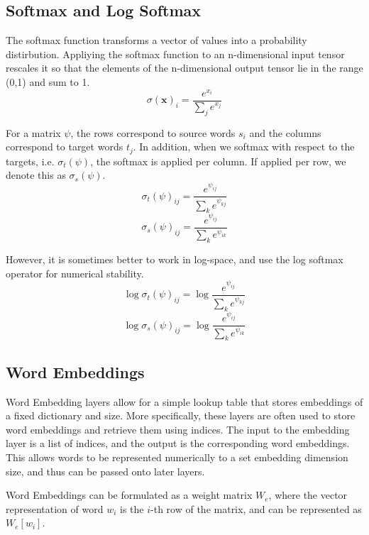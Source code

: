 \documentclass[twoside,twocolumn]{article}
\renewcommand{\vec}[1]{\mathbf{#1}}
\begin{document}
\subsection{Softmax and Log Softmax}
The softmax function transforms a vector of values into a probability
distirbution. Appliying the softmax function to an n-dimensional input tensor
rescales it so that the elements of the n-dimensional output tensor lie in the
range (0,1) and sum to 1.
\begin{equation}
  \sigma(\vec{x})_i = \frac{e^{x_i}}{\sum_j e^{x_j}}
\end{equation}

For a matrix $\psi$, the rows correspond to source words $s_i$ and the
columns correspond to target words $t_j$. In addition, when we softmax
with respect to the targets, i.e. $\sigma_t(\psi)$, the softmax is applied
per column. If applied per row, we denote this as $\sigma_s(\psi)$.
\begin{equation}
  \sigma_t(\psi)_{ij} = \frac{e^{\psi_{ij}}}{\sum_{k} e^{\psi_{kj}}}
\end{equation}
\begin{equation}
  \sigma_s(\psi)_{ij} = \frac{e^{\psi_{ij}}}{\sum_{k} e^{\psi_{ik}}}
\end{equation}

However, it is sometimes better to work in log-space, and use the log
softmax operator for numerical stability.
\begin{equation}
  \log \sigma_t(\psi)_{ij} = \log \frac{e^{\psi_{ij}}}{\sum_{k} e^{\psi_{kj}}}
\end{equation}
\begin{equation}
  \log \sigma_s(\psi)_{ij} = \log \frac{e^{\psi_{ij}}}{\sum_{k} e^{\psi_{ik}}}
\end{equation}

\subsection{Word Embeddings}
Word Embedding layers allow for a simple lookup table that stores embeddings
of a fixed dictionary and size. More specifically, these layers are often used
to store word embeddings and retrieve them using indices. The input to the
embedding layer is a list of indices, and the output is the corresponding
word embeddings. This allows words to be represented numerically to a set
embedding dimension size, and thus can be passed onto later layers.

Word Embeddings can be formulated as a weight matrix $W_e$, where the
vector representation of word $w_i$ is the $i$-th row of the matrix, and
can be represented as
$W_e[w_i]$.
\end{document}
